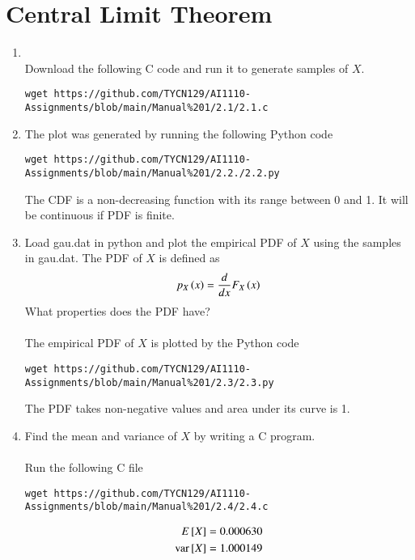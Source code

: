 \documentclass[journal,12pt,twocolumn]{IEEEtran}
\renewcommand\thesection{\arabic{section}}
\begin{document}
\section{Central Limit Theorem}
\begin{enumerate}[label=\thesection.\arabic*
,ref=\thesection.\theenumi]
\item \solution\\
Download the following C code and run it to generate samples of $X$.
\begin{lstlisting}
wget https://github.com/TYCN129/AI1110-Assignments/blob/main/Manual%201/2.1/2.1.c
\end{lstlisting}
\item \solution

The plot was generated by running the following Python code
\begin{lstlisting}
wget https://github.com/TYCN129/AI1110-Assignments/blob/main/Manual%201/2.2./2.2.py
\end{lstlisting}
The CDF is a non-decreasing function with its range between 0 and 1. It will be continuous if PDF is finite.\\
\item {Load gau.dat in python and plot the empirical PDF of $X$ using the samples in gau.dat. The PDF of $X$ is defined as
\begin{align}
p_{X}\left(x\right) = \frac{d}{dx}F_{X}\left(x\right)
\label{eq:pdf_cdf}
\end{align}
What properties does the PDF have?}\\
\solution \\
The empirical PDF of $X$ is plotted by the Python code
\begin{lstlisting}
wget https://github.com/TYCN129/AI1110-Assignments/blob/main/Manual%201/2.3/2.3.py
\end{lstlisting}
The PDF takes non-negative values and area under its curve is 1.

\item Find the mean and variance of $X$ by writing a C program.
\\
\solution\\
Run the following C file
\begin{lstlisting}
wget https://github.com/TYCN129/AI1110-Assignments/blob/main/Manual%201/2.4/2.4.c
\end{lstlisting}
\begin{align}
E{}\left[X\right]  &= 0.000630 \\
\text{var}{}\left[X\right]  &= 1.000149
\end{align}


\end{enumerate}
\end{document}
